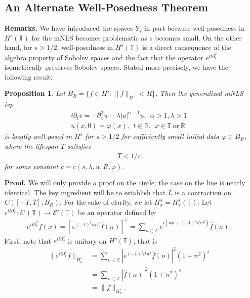 \documentclass[12pt,reqno]{amsart}
\newcommand{\wh}{\widehat}
\newcommand{\rr}{\mathbb{R}}
\newcommand{\p}{\partial}
\newcommand{\zz}{\mathbb{Z}}
\newcommand{\ci}{\mathbb{T}}
\newcommand{\vp}{\varphi}
\theoremstyle{plain}  %
\newtheorem{proposition}{Proposition}
\begin{document}
\begin{appendices}
\section{An Alternate Well-Posedness Theorem}
%
%
%
%
%
%
%
%
%
%
{\bf Remarks.} We have introduced the spaces $Y_s$ in part because well-posedness
in $H^s(\ci)$ for the mNLS becomes problematic as $s$ becomes small. 
On the other hand, for $s > 1/2$, well-posedness in $H^s(\ci)$ is a direct 
consequence of the algebra property of Sobolev spaces and the fact that the operator 
$e^{it \p_x^2}$ isometrically preserves Sobolev spaces. Stated more 
precisely, we have the following result:
%
%
\begin{proposition}
	Let $B_R \doteq \{f \in H^s : \|f\|_{H^s} < R \}$.
	Then the generalized mNLS ivp
\begin{gather}
	\label{general-mNLS-eq}
		i \p_t v = - \p_x^2 u - \lambda |u|^{\alpha -1} u, \ \ \alpha > 
		1, \lambda > 1
		\\
		\label{general-mNLS-init-data}
		u(x,0) = \vp(x), \ \ t \in \rr, \ \ x \in \ci \ \text{or} \ \rr
\end{gather}
	is locally well-posed in $H^s$ for $s > 1/2$ for 
	sufficiently small initial data $\vp \in B_R$, where the lifespan $T$ 
	satisfies 
%
%
\begin{equation*}
	\begin{split}
		T < 1/c
	\end{split}
\end{equation*}
%
%
for some constant $c = c(s, \lambda, \alpha, R, \vp)$.
\end{proposition}
%
%
{\bf Proof.} We will only provide a proof on the circle; the case on 
the line is nearly identical. The key ingredient
will be to establish that $L$ is a 
contraction on $C([-T, T], B_R)$. For the sake of clarity, we let $H^s_x 
= H^s_x(\ci)$. Let $e^{it \p_x^2}: \mathcal{E}'(\ci) \to 
\mathcal{E}'(\ci)$ be an operator defined by  
%
%
\begin{equation}
	\label{unit-op}
	\begin{split}
		e^{it \p_x^2} f(x) = \left[ e^{(-1)^j i t n^2} \wh{f}(n)
		\right]^{\vee} = 
		\sum_{n \in \zz} e^{i(nx + (-1)^j it n^2)} \wh{f}(n).
	\end{split}
\end{equation}
%
%
First, note that $e^{it \p_x^2}$ 
is unitary on $H^s(\ci)$; that is
%
%
\begin{equation}
	\label{unitary-op}
	\begin{split}
		\|e^{it \p_x^2} f \|_{H^s_x} & = \sum_{n \in \zz} |e^{(-1)^j it n^2} 
		\wh{f}(n)|^2 (1 + n^2)^s  
		\\
		& = \sum_{n \in \zz} |\wh{f}(n)|^2 (1 + n^2)^s 
		\\
		& = \|f\|_{H^s_x}.
	\end{split}
\end{equation}


\end{appendices}
\end{document}
